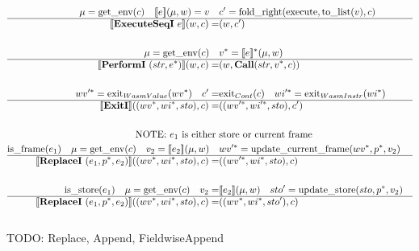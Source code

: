 \begin{align*}
%
\newline \\
  \mu = \text{get\_env}(c) \quad
  \sem{e}(\mu, w) = v \quad&
  c' = \text{fold\_right}(\text{execute}, \text{to\_list}(v), c) \\
  \hline
  \sem{\executeseqi ~ e}(w, c) =& (w, c') \\
%
\newline \\
  \mu = \text{get\_env}(c) \quad&
  \seq v = \seq{\sem{e}}(\mu, w) \\
  \hline
  \sem{\performi ~ (str, \seq e)}(w, c) =& (w, \call (str, \seq v, c)) \\
%
\newline \\
  \seq{wv'} = \text{exit}_{WasmValue}(\seq{wv}) \quad
  c' =& \text{exit}_{Cont}(c) \quad
  \seq{wi'} = \text{exit}_{WasmInstr}(\seq{wi}) \\
  \hline
  \sem{\exiti}((\seq{wv}, \seq{wi}, sto), c)
  =&
  ((\seq{wv'}, \seq{wi'}, sto), c') \\
%
\newline \\
\text{NOTE: $e_1$ is either }&\text{store or current frame} \\
  \text{is\_frame}(e_1) \quad
  \mu = \text{get\_env}(c) \quad
  v_2 = \sem{e_2}(\mu, w) \quad&
  \seq{wv'} = \text{update\_current\_frame}(\seq{wv}, \seq p, v_2) \\
  \hline
  \sem{\replacei ~ (e_1, \seq p, e_2)}((\seq{wv}, \seq{wi}, sto), c)
  =& ((\seq{wv'}, \seq{wi}, sto), c) \\
%
\newline \\
  \text{is\_store}(e_1) \quad
  \mu = \text{get\_env}(c) \quad
  v_2 =& \sem{e_2}(\mu, w) \quad
  sto' = \text{update\_store}(sto, \seq p, v_2) \\
  \hline
  \sem{\replacei ~ (e_1, \seq p, e_2)}((\seq{wv}, \seq{wi}, sto), c)
  =& ((\seq{wv}, \seq{wi}, sto'), c) \\
\newline \\
\end{align*}
TODO: Replace, Append, FieldwiseAppend

